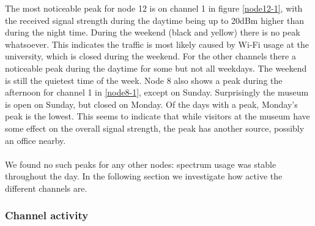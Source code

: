 \documentclass[a4paper, 11pt]{article}
\begin{document}
The most noticeable peak for node 12 is on channel 1 in figure \ref{node12-1}, with the received signal strength during the daytime being up to 20dBm higher than during the night time. During the weekend (black and yellow) there is no peak whatsoever. This indicates the traffic is most likely caused by Wi-Fi usage at the university, which is closed during the weekend. For the other channels there a noticeable peak during the daytime for some but not all weekdays. The weekend is still the quietest time of the week. Node 8 also shows a peak during the afternoon for channel 1 in \ref{node8-1}, except on Sunday. Surprisingly the museum is open on Sunday, but closed on Monday. Of the days with a peak, Monday's peak is the lowest. This seems to indicate that while visitors at the museum have some effect on the overall signal strength, the peak has another source, possibly an office nearby. \\ \\
We found no such peaks for any other nodes: spectrum usage was stable throughout the day. In the following section we investigate how active the different channels are.


\subsubsection{Channel activity}
\end{document}
